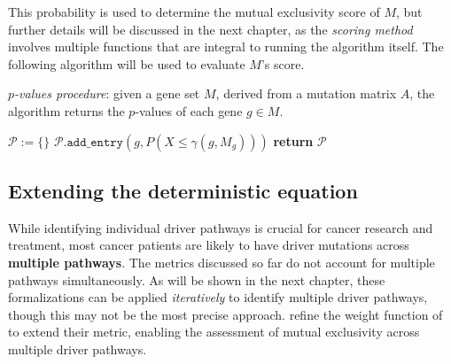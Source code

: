\begin{table}[H] \label{contingency}
    \centering
    \caption{The Fisher's exact test performed by \textcite{mutex}.}
\end{table}

This probability is used to determine the mutual exclusivity score of $M$, but further details will be discussed in the next chapter, as the \textit{scoring method} involves multiple functions that are integral to running the algorithm itself. The following algorithm will be used to evaluate $M$'s score.

\begin{algorithm}[H]
    \caption{
        \textit{$p$-values procedure}: given a gene set $M$, derived from a mutation matrix $A$, the algorithm returns the $p$-values of each gene $g \in M$.
    }

        \label{p-values_procedure}
    \begin{algorithmic}[1]
            \State $\mathcal P := \texttt{\{\}}$
                \State $\mathcal P.\texttt{add\_entry}(g, P(X \le \gamma(g, M_g)))$ 
            \EndFor
            \State \textbf{return} $\mathcal P$
        \EndFunction
    \end{algorithmic}
\end{algorithm}

\subsection{Extending the deterministic equation} \label{multi_dendrix_2nd_chap}

While identifying individual driver pathways is crucial for cancer research and treatment, most cancer patients are likely to have driver mutations across \textbf{multiple pathways}. The metrics discussed so far do not account for multiple pathways simultaneously. As will be shown in the next chapter, these formalizations can be applied \textit{iteratively} to identify multiple driver pathways, though this may not be the most precise approach. \textcite{multi-dendrix} refine the weight function of \textcite{dendrix} to extend their metric, enabling the assessment of mutual exclusivity across multiple driver pathways.

